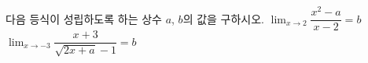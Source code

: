 다음 등식이 성립하도록 하는 상수 $a$, $b$의 값을 구하시오.
 $\displaystyle\lim_{x\to 2}\dfrac{x^2-a}{x-2}=b$
 $\displaystyle\lim_{x\to -3}\dfrac{x+3}{\sqrt{2x+a}-1}=b$ 
